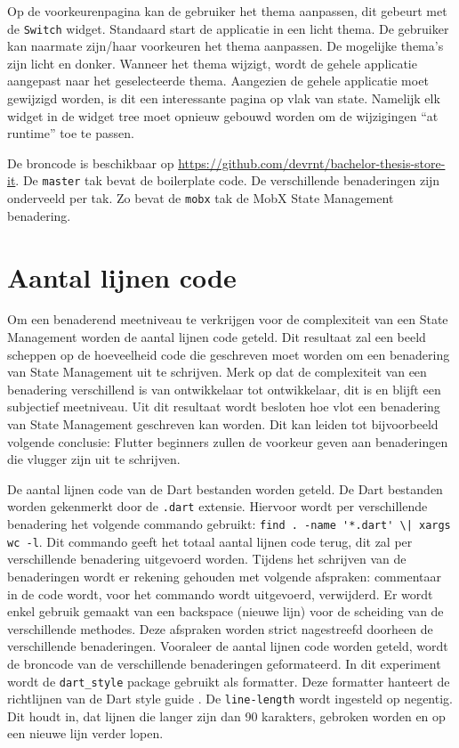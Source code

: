 Op de voorkeurenpagina kan de gebruiker het thema aanpassen, dit gebeurt met de \verb|Switch| widget. Standaard start de applicatie in een licht thema. De gebruiker kan naarmate zijn/haar voorkeuren het thema aanpassen. De mogelijke thema's zijn licht en donker.
Wanneer het thema wijzigt, wordt de gehele applicatie aangepast naar het geselecteerde thema. Aangezien de gehele applicatie moet gewijzigd worden, is dit een interessante pagina op vlak van state. Namelijk elk widget in de widget tree moet opnieuw gebouwd worden om de wijzigingen ``at runtime'' toe te passen.


De broncode is beschikbaar op \url{https://github.com/devrnt/bachelor-thesis-store-it}\autocite{Vrient2019}. De \verb|master| tak bevat de boilerplate code. De verschillende benaderingen zijn onderveeld per tak. Zo bevat de \verb|mobx| tak de MobX State Management benadering.

\section{Aantal lijnen code}
\label{ch:loc}
Om een benaderend meetniveau te verkrijgen voor de complexiteit van een State Management worden de aantal lijnen code geteld. Dit resultaat zal een beeld scheppen op de hoeveelheid code die geschreven moet worden om een benadering van State Management uit te schrijven. Merk op dat de complexiteit van een benadering verschillend is van ontwikkelaar tot ontwikkelaar, dit is en blijft een subjectief meetniveau. Uit dit resultaat wordt besloten hoe vlot een benadering van State Management geschreven kan worden. Dit kan leiden tot bijvoorbeeld volgende conclusie: Flutter beginners zullen de voorkeur geven aan benaderingen die vlugger zijn uit te schrijven. 

De aantal lijnen code van de Dart bestanden worden geteld. De Dart bestanden worden gekenmerkt door de \verb|.dart| extensie. Hiervoor wordt per verschillende benadering het volgende commando gebruikt: \verb=find . -name '*.dart' \| xargs wc -l=. Dit commando geeft het totaal aantal lijnen code terug, dit zal per verschillende benadering uitgevoerd worden. \newline 
Tijdens het schrijven van de benaderingen wordt er rekening gehouden met volgende afspraken: commentaar in de code wordt, voor het commando wordt uitgevoerd, verwijderd. Er wordt enkel gebruik gemaakt van een backspace (nieuwe lijn) voor de scheiding van de verschillende methodes. Deze afspraken worden strict nagestreefd doorheen de verschillende benaderingen. \newline
\newline
Vooraleer de aantal lijnen code worden geteld, wordt de broncode van de verschillende benaderingen geformateerd. In dit experiment wordt de \verb|dart_style| package gebruikt als formatter. Deze formatter hanteert de richtlijnen van de Dart style guide \autocite{Dart2019a}. De \verb|line-length| wordt ingesteld op negentig. Dit houdt in, dat lijnen die langer zijn dan 90 karakters, gebroken worden en op een nieuwe lijn verder lopen.


